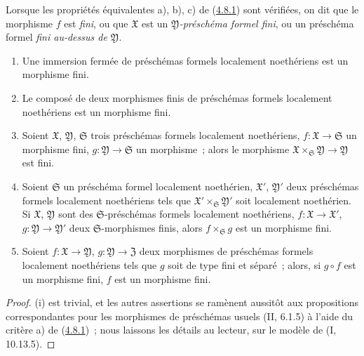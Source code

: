 \begin{definition}[4.8.2]
\label{III.4.8.2-fr}
Lorsque les propriétés équivalentes a), b), c) de
(\hyperref[III.4.8.1-fr]{4.8.1}) sont vérifiées, on dit que le morphisme $f$
est \emph{fini}, ou que $\mathfrak X$ est un \emph{$\mathfrak Y$-préschéma
formel fini}, ou un préschéma formel \emph{fini au-dessus de $\mathfrak Y$}.
\end{definition}

\begin{proposition}[4.8.3]
\label{III.4.8.3-fr}
\begin{enumerate}
\item[(i)] Une immersion fermée de préschémas formels localement noethériens
  est un morphisme fini.
\item[(ii)] Le composé de deux morphismes finis de préschémas formels
  localement noethériens est un morphisme fini.
\item[(iii)] Soient $\mathfrak X$, $\mathfrak Y$, $\mathfrak S$ trois
  préschémas formels localement noethériens, $f:\mathfrak X\to\mathfrak S$ un
  morphisme fini, $g:\mathfrak Y\to\mathfrak S$ un morphisme~; alors le
  morphisme
  $\mathfrak X\times_{\mathfrak S}\mathfrak Y\to\mathfrak Y$ est fini.
\item[(iv)] Soient $\mathfrak S$ un préschéma formel localement noethérien,
  $\mathfrak X'$, $\mathfrak Y'$ deux préschémas formels localement
  noethériens tels que $\mathfrak X'\times_{\mathfrak S}\mathfrak Y'$ soit
  localement noethérien. Si $\mathfrak X$, $\mathfrak Y$ sont des
  $\mathfrak S$-préschémas formels localement noethériens,
  $f:\mathfrak X\to\mathfrak X'$, $g:\mathfrak Y\to\mathfrak Y'$ deux
  $\mathfrak S$-morphismes finis, alors $f\times_{\mathfrak S}g$ est un
  morphisme fini.
\item[(v)] Soient $f:\mathfrak X\to\mathfrak Y$,
  $g:\mathfrak Y\to\mathfrak Z$ deux morphismes de préschémas formels
  localement noethériens tels que $g$ soit de type fini et séparé~; alors, si
  $g\circ f$ est un morphisme fini, $f$ est un morphisme fini.
\end{enumerate}
\end{proposition}

\begin{proof}
(i) est trivial, et les autres assertions se ramènent aussitôt aux
propositions correspondantes pour les morphismes de préschémas usuels
(II, 6.1.5) à l'aide du critère a) de
(\hyperref[III.4.8.1-fr]{4.8.1})~; nous laissons les détails au lecteur, sur le
modèle de (I, 10.13.5).
\end{proof}

